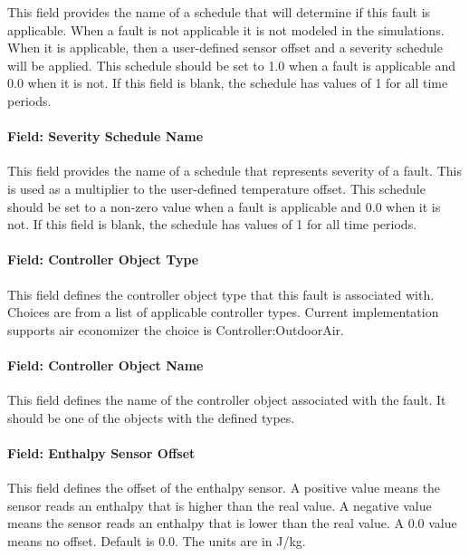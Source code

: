 This field provides the name of a schedule that will determine if this fault is applicable. When a fault is not applicable it is not modeled in the simulations. When it is applicable, then a user-defined sensor offset and a severity schedule will be applied. This schedule should be set to 1.0 when a fault is applicable and 0.0 when it is not. If this field is blank, the schedule has values of 1 for all time periods.

\paragraph{Field: Severity Schedule Name}\label{field-severity-schedule-name-4}

This field provides the name of a schedule that represents severity of a fault. This is used as a multiplier to the user-defined temperature offset. This schedule should be set to a non-zero value when a fault is applicable and 0.0 when it is not. If this field is blank, the schedule has values of 1 for all time periods.

\paragraph{Field: Controller Object Type}\label{field-controller-object-type-4}

This field defines the controller object type that this fault is associated with. Choices are from a list of applicable controller types. Current implementation supports air economizer the choice is Controller:OutdoorAir.

\paragraph{Field: Controller Object Name}\label{field-controller-object-name-4}

This field defines the name of the controller object associated with the fault. It should be one of the objects with the defined types.

\paragraph{Field: Enthalpy Sensor Offset}\label{field-enthalpy-sensor-offset-1}

This field defines the offset of the enthalpy sensor. A positive value means the sensor reads an enthalpy that is higher than the real value. A negative value means the sensor reads an enthalpy that is lower than the real value. A 0.0 value means no offset. Default is 0.0. The units are in J/kg.

